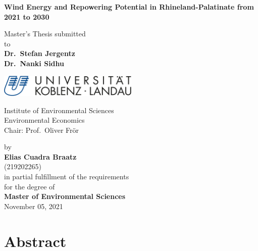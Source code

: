 \documentclass[a4paper,11pt]{article}
\begin{document}
\thispagestyle{empty}
\begin{center}
  \vspace*{5mm}
  \linespread{1.5}
  {\huge{\bf Wind Energy and Repowering Potential in Rhineland-Palatinate from 2021 to 2030}\par}\vspace{1cm}
  Master's Thesis submitted \\\vspace{0.5cm}
  to \\\vspace{0.5cm}
  \textbf{Dr.~Stefan Jergentz} \\
  \textbf{Dr.~Nanki Sidhu} \\\vspace{1.5cm}
  
  
  \includegraphics[width=0.5\textwidth]{Uni-Logo-2.jpg}
  
  Institute of Environmental Sciences \\
  Environmental Economics \\
   Chair: Prof.~Oliver Frör \\  \vspace{1cm}

  
  
  by \\\vspace{0.5cm}
  \textbf{Elias Cuadra Braatz} \\
  (219202265) \\
  
  \medskip
  \medskip
  in partial fulfillment of the requirements \\
  for the degree of \\
  \textbf{Master of Environmental Sciences} \\\vspace{0.5cm}
  November 05, 2021
  
\end{center}


\newpage
\tableofcontents
\clearpage

\newpage
\hypertarget{abstract}{%
\section*{Abstract}\label{abstract}}
\end{document}
